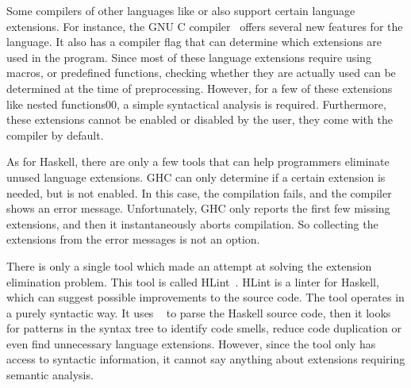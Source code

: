 \documentclass[main.tex]{subfiles}
\begin{document}
	
	Some compilers of other languages like  or  also support certain language extensions. For instance, the GNU C compiler~\cite{gnu-docs} offers several new features for the language. It also has a compiler flag that can determine which extensions are used in the program. Since most of these language extensions require using macros, or predefined functions, checking whether they are actually used can be determined at the time of preprocessing. However, for a few of these extensions like nested functions00, a simple syntactical analysis is required. Furthermore, these extensions cannot be enabled or disabled by the user, they come with the compiler by default.
	
	As for Haskell, there are only a few tools that can help programmers eliminate unused language extensions. GHC can only determine if a certain extension is needed, but is not enabled. In this case, the compilation fails, and the compiler shows an error message. Unfortunately, GHC only reports the first few missing extensions, and then it instantaneously aborts compilation. So collecting the extensions from the error messages is not an option.
	
	There is only a single tool which made an attempt at solving the extension elimination problem. This tool is called HLint~\cite{hlint-bib}. HLint is a linter for Haskell, which can suggest possible improvements to the source code. The tool operates in a purely syntactic way. It uses ~\cite{haskell-src-exts} to parse the Haskell source code, then it looks for patterns in the syntax tree to identify code smells, reduce code duplication or even find unnecessary language extensions. However, since the tool only has access to syntactic information, it cannot say anything about extensions requiring semantic analysis.
	
	
\end{document}
